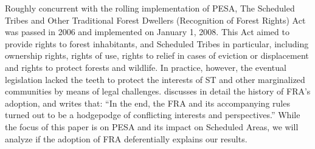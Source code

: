\documentclass[12pt,reqno]{article}
\begin{document}
Roughly concurrent with the rolling implementation of PESA, The Scheduled Tribes and Other Traditional Forest Dwellers (Recognition of Forest Rights) Act was passed in 2006 and implemented on January 1, 2008. This Act aimed to provide rights to forest inhabitants, and Scheduled Tribes in particular, including ownership rights, rights of use, rights to relief in cases of eviction or displacement and rights to protect forests and wildlife. In practice, however, the eventual legislation lacked the teeth to protect the interests of ST and other marginalized communities by means of legal challenges. \textcite{kashwan2017democracy} discusses in detail the history of FRA's adoption, and writes that: ``In the end, the FRA and its accompanying rules turned out to be a hodgepodge of conflicting interests and perspectives.'' While the focus of this paper is on PESA and its impact on Scheduled Areas, we will analyze if the adoption of FRA deferentially explains our results.








\end{document}
